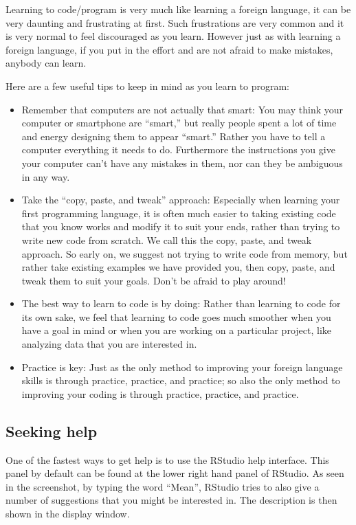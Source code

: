 \documentclass[]{book}
\providecommand{\tightlist}{%
  \setlength{\itemsep}{0pt}\setlength{\parskip}{0pt}}
\begin{document}
Learning to code/program is very much like learning a foreign language, it can be very daunting and frustrating at first. Such frustrations are very common and it is very normal to feel discouraged as you learn. However just as with learning a foreign language, if you put in the effort and are not afraid to make mistakes, anybody can learn.

Here are a few useful tips to keep in mind as you learn to program:

\begin{itemize}
\tightlist
\item
  Remember that computers are not actually that smart: You may think your computer or smartphone are ``smart,'' but really people spent a lot of time and energy designing them to appear ``smart.'' Rather you have to tell a computer everything it needs to do. Furthermore the instructions you give your computer can't have any mistakes in them, nor can they be ambiguous in any way.
\item
  Take the ``copy, paste, and tweak'' approach: Especially when learning your first programming language, it is often much easier to taking existing code that you know works and modify it to suit your ends, rather than trying to write new code from scratch. We call this the copy, paste, and tweak approach. So early on, we suggest not trying to write code from memory, but rather take existing examples we have provided you, then copy, paste, and tweak them to suit your goals. Don't be afraid to play around!
\item
  The best way to learn to code is by doing: Rather than learning to code for its own sake, we feel that learning to code goes much smoother when you have a goal in mind or when you are working on a particular project, like analyzing data that you are interested in.
\item
  Practice is key: Just as the only method to improving your foreign language skills is through practice, practice, and practice; so also the only method to improving your coding is through practice, practice, and practice.
\end{itemize}

\hypertarget{seeking-help}{%
\subsection*{Seeking help}\label{seeking-help}}

One of the fastest ways to get help is to use the RStudio help interface. This panel by default can be found at the lower right hand panel of RStudio. As seen in the screenshot, by typing the word ``Mean'', RStudio tries to also give a number of suggestions that you might be interested in. The description is then shown in the display window.
\end{document}
